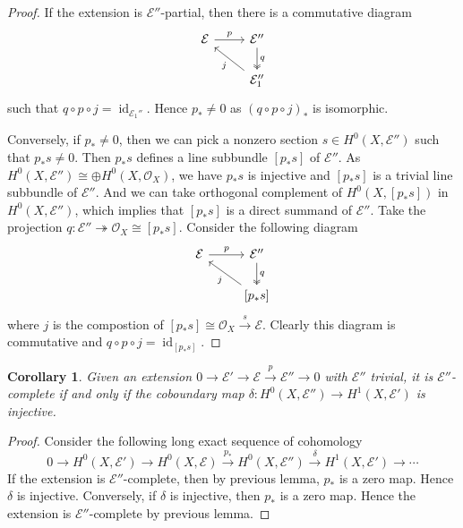 \documentclass{ctexart}
\newtheorem{corollary}{Corollary}[section]
\newcommand{\identity}{\operatorname{id}}
\begin{document}
\begin{proof}
    If the extension is $\mathcal{E}''$-partial, then there is a commutative diagram
    \begin{equation}
        \begin{tikzcd}
            \mathcal{E} \arrow[r, "p"] &
            \mathcal{E}'' \arrow[d, twoheadrightarrow, "q"] \\
            & \mathcal{E}_{1}'' \arrow[ul, "j"]
        \end{tikzcd}
    \end{equation}
    such that $q \circ p \circ j = \identity_{\mathcal{E}_{1}''}$.
    Hence $p_{\ast} \neq 0$ as $(q \circ p \circ j)_{\ast}$ is isomorphic.
    \par
    Conversely, if $p_{\ast} \neq 0$, then we can pick a nonzero section $s\in H^{0}(X, \mathcal{E}'')$ such that $p_{\ast}s \neq 0$.
    Then $p_{\ast}s$ defines a line subbundle $[p_{\ast}s]$ of $\mathcal{E}''$.
    As $H^{0}(X, \mathcal{E}'') \cong \oplus H^{0}(X, \mathcal{O}_{X})$, we have $p_{\ast}s$ is injective and $[p_{\ast}s]$ is a trivial line subbundle of $\mathcal{E}''$.
    And we can take orthogonal complement of $H^{0}(X, [p_{\ast}s])$ in $H^{0}(X, \mathcal{E}'')$, which implies that $[p_{\ast}s]$ is a direct summand of $\mathcal{E}''$.
    Take the projection $q: \mathcal{E}'' \twoheadrightarrow \mathcal{O}_{X} \cong [p_{\ast}s]$.
    Consider the following diagram
    \begin{equation}
        \begin{tikzcd}
            \mathcal{E} \arrow[r, "p"] &
            \mathcal{E}'' \arrow[d, twoheadrightarrow, "q"] \\
            & {[p_{\ast}s]} \arrow[ul, "j"]
        \end{tikzcd}
    \end{equation}
    where $j$ is the compostion of $[p_{\ast}s] \cong \mathcal{O}_{X} \overset{s}{\rightarrow} \mathcal{E}$.
    Clearly this diagram is commutative and $q \circ p \circ j = \identity_{[p_{\ast}s]}$.
\end{proof}
\begin{corollary}
    Given an extension $0 \rightarrow \mathcal{E}' \rightarrow \mathcal{E} \overset{p}{\rightarrow} \mathcal{E}'' \rightarrow 0$ with $\mathcal{E}''$ trivial,
    it is $\mathcal{E}''$-complete if and only if the coboundary map $\delta: H^{0}(X, \mathcal{E}'') \to H^{1}(X, \mathcal{E}')$ is injective.
    \label{Corollary 5.5}
\end{corollary}
\begin{proof}
    Consider the following long exact sequence of cohomology
    \begin{equation}
        0 \rightarrow H^{0}(X, \mathcal{E}') \rightarrow H^{0}(X, \mathcal{E}) \overset{p_{\ast}}{\rightarrow} H^{0}(X, \mathcal{E}'') \overset{\delta}{\rightarrow} H^{1}(X, \mathcal{E}') \rightarrow \cdots
    \end{equation}
    If the extension is $\mathcal{E}''$-complete, then by previous lemma, $p_{\ast}$ is a zero map.
    Hence $\delta$ is injective.
    Conversely, if $\delta$ is injective, then $p_{\ast}$ is a zero map.
    Hence the extension is $\mathcal{E}''$-complete by previous lemma.
\end{proof}
\end{document}
